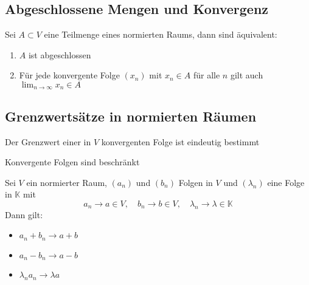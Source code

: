 	\subsection{Abgeschlossene Mengen und Konvergenz}
		\begin{Satz} [ ]
			Sei $A\subset V$ eine Teilmenge eines normierten Raums, dann sind äquivalent:
			\begin{enumerate}
				\item $A$ ist abgeschlossen
				\item Für jede konvergente Folge $(x_n)$ mit $x_n \in A$ für alle $n$ gilt auch $\lim_{n\to\infty}x_n \in A$
			\end{enumerate}
		\end{Satz}
	\subsection{Grenzwertsätze in normierten Räumen}
		\begin{Satz} [ ]
			Der Grenzwert einer in $V$ konvergenten Folge ist eindeutig bestimmt
		\end{Satz}
		\begin{Satz} [ ]
			Konvergente Folgen sind beschränkt
		\end{Satz}
		\begin{Satz} [ ]
			Sei $V$ ein normierter Raum, $(a_n)$ und $(b_n)$ Folgen in $V$ und $(\lambda_n)$ eine Folge in $\mathbb{K}$ mit 
			$$
				a_n\to a\in V, \quad b_n\to b \in V, \quad \lambda_n \to \lambda \in \mathbb{K}
			$$ 
			Dann gilt:
			\begin{itemize}
				\item $a_n + b_n \to a + b$
				\item $a_n - b_n \to a - b$
				\item $\lambda_n a_n \to \lambda a$
			\end{itemize}
		\end{Satz}
		
		
		
		